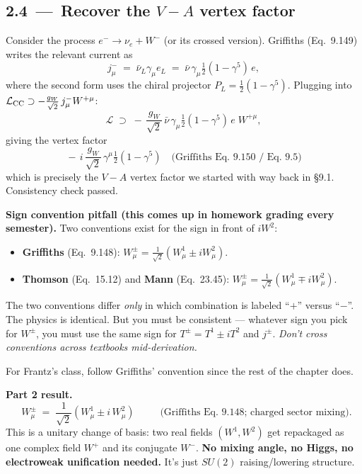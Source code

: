 \documentclass[11pt]{article}
\begin{document}
\subsection*{2.4 \,---\, Recover the $V-A$ vertex factor}

\begin{stepbox}[title=Step 2.4: Check that the standard vertex factor pops out]
Consider the process $e^- \to \nu_e + W^-$ (or its crossed version). Griffiths
(Eq.~9.149) writes the relevant current as
\[
j^-_\mu \;=\; \bar{\nu}_L \gamma_\mu e_L \;=\; \bar{\nu}\, \gamma_\mu \tfrac{1}{2}(1-\gamma^5)\, e ,
\]
where the second form uses the chiral projector $P_L = \tfrac{1}{2}(1-\gamma^5)$.
Plugging into $\mathcal{L}_{\rm CC} \supset -\tfrac{g_W}{\sqrt2}\, j^-_\mu W^{+\mu}$:
\[
\mathcal{L} \;\supset\; -\,\frac{g_W}{\sqrt2}\,\bar{\nu}\, \gamma_\mu \tfrac{1}{2}(1-\gamma^5)\, e\; W^{+\mu} ,
\]
giving the vertex factor
\[
\boxed{\;\;
-\,i\,\frac{g_W}{\sqrt{2}}\, \gamma^\mu \tfrac{1}{2}(1-\gamma^5)
\quad\text{(Griffiths Eq.~9.150 / Eq.~9.5)}\;\;}
\]
which is precisely the $V-A$ vertex factor we started with way back in §9.1. Consistency
check passed.
\end{stepbox}

\begin{warnbox}
\textbf{Sign convention pitfall (this comes up in homework grading every semester).}
Two conventions exist for the sign in front of $iW^2$:
\begin{itemize}[leftmargin=*]
  \item \textbf{Griffiths} (Eq.~9.148):
        $W^\pm_\mu = \tfrac{1}{\sqrt2}(W^1_\mu \pm i W^2_\mu)$.
  \item \textbf{Thomson} (Eq.~15.12) and \textbf{Mann} (Eq.~23.45):
        $W^\pm_\mu = \tfrac{1}{\sqrt2}(W^1_\mu \mp i W^2_\mu)$.
\end{itemize}
The two conventions differ \emph{only} in which combination is labeled ``$+$'' versus ``$-$''.
The physics is identical. But you must be consistent --- whatever sign you pick for $W^\pm$,
you must use the same sign for $T^\pm = T^1 \pm i T^2$ and $j^\pm$. \emph{Don't cross
conventions across textbooks mid-derivation.}

For Frantz's class, follow Griffiths' convention since the rest of the chapter does.
\end{warnbox}

\begin{resultbox}
\textbf{Part 2 result.}
\[
\boxed{\;\;
W^{\pm}_\mu \;=\; \frac{1}{\sqrt{2}}\!\left( W^1_\mu \pm i\, W^2_\mu \right)
\;\;}
\qquad\text{(Griffiths Eq.~9.148; charged sector mixing).}
\]
This is a unitary change of basis: two real fields $(W^1, W^2)$ get repackaged as one
complex field $W^+$ and its conjugate $W^-$. \textbf{No mixing angle, no Higgs, no
electroweak unification needed.} It's just $SU(2)$ raising/lowering structure.
\end{resultbox}
\end{document}
